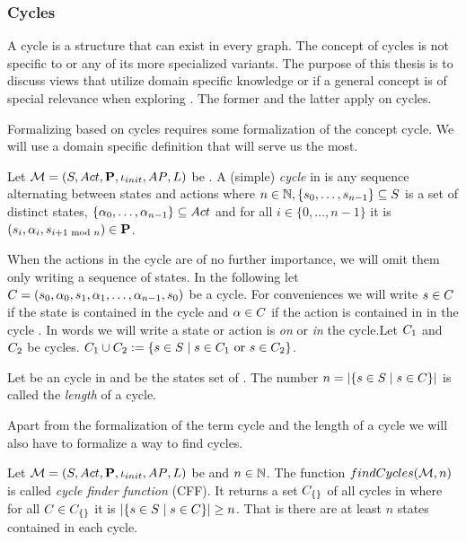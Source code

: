 \documentclass[preview]{standalone}
\begin{document}
\subsubsection{Cycles}
A cycle is a structure that can exist in every graph. The concept of cycles is not specific to \chosengraphtypesN or any of its more specialized variants. The purpose of this thesis is to discuss views that utilize domain specific knowledge or if a general concept is of special relevance when exploring \chosengraphtypeN. The former and the latter apply on cycles.

Formalizing \viewsN based on cycles requires some formalization of the concept cycle. We will use a domain specific definition that will serve us the most.

\begin{definition}
	Let ${{{\mathcal{M}}}} = {{({S}, {Act}, {\textbf{P}}, {\iota_{init}}, {AP}, {L})}}$ be \chosengraphtypeN. A (simple) \emph{cycle} in \chgph is any sequence \cyclesecfull alternating between states and actions where $n \in {\mathbb{N}}, \{{s}_0, \dots, {s}_{n-1}\} \subseteq {S}$ is a set of distinct states,  $\{{\alpha}_0, \dots, {\alpha}_{n-1}\} \subseteq {Act}$ and for all $i \in \{0, \dots, n-1\}$ it is $({s}_i,{\alpha}_i, {s}_{i+1 \text{ mod }n}) \in {\ensuremath{{\textbf{P}}}}$.
\end{definition}

When the actions in the cycle are of no further importance, we will omit them only writing a sequence of states. In the following let ${C} = {({s}_0, {\alpha}_0, {s}_1, {\alpha}_1, \dots, {\alpha}_{n-1}, {s}_0)}$ be a cycle. For conveniences we will write ${s} \in {C}$ if the state is contained in the cycle \cycle and ${\alpha} \in {C}$ if the action is contained in in the cycle \cycle.  In words we will write a state or action is \emph{on} or \emph{in} the cycle.Let ${C}_1$ and ${C}_2$ be cycles. ${C}_1 \cup {C}_2 := \{{s} \in {S} \mid {s} \in {C}_1 \text{ or } {s} \in {C}_2\}$.

\begin{definition}
	Let \cycle be an cycle in \chgph and \states be the states set of \chgph. The number $n = |\{{s} \in {S} \mid {s} \in {C}\}|$ is called the \emph{length} of a cycle. 
\end{definition}

Apart from the formalization of the term cycle and the length of a cycle we will also have to formalize a way to find cycles.

\begin{definition}
	Let ${{{\mathcal{M}}}} = {{({S}, {Act}, {\textbf{P}}, {\iota_{init}}, {AP}, {L})}}$ be \chosengraphtypeN and $n \in {\mathbb{N}}$. The function  ${findCycles}({{{\mathcal{M}}}}, n)$ is called \emph{cycle finder function} (CFF). It returns a set ${{C}_{\{\}}}$ of all cycles in \chgph where for all $\cycle \in \cycleset$ it is $|\{{s} \in {S} \mid {s} \in {C}\}| \geq n$. That is there are at least $n$ states contained in each cycle. 
\end{definition}
\end{document}
